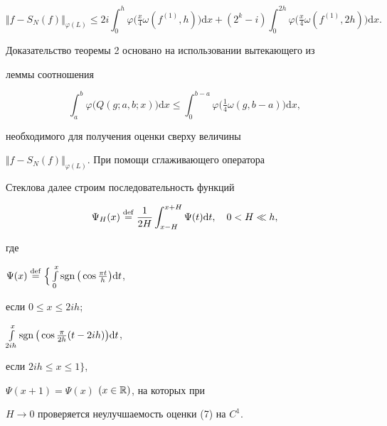 \begin{equation}


\Vert f-S_N(f)\Vert_{\varphi(L)} \leqslant 2i \int_0^h 


\varphi\big(\tfrac{x}{4} \omega(f^{(1)},h)\big)\mathrm{d} x +


(2^k -i) \int_0^{2h} \varphi\big(\tfrac{x}{4} \omega(f^{(1)},2h)\big)


\mathrm{d}x.


\end{equation}


\medskip





Доказательство теоремы 2 основано на использовании вытекающего из


леммы соотношения


$$


\int_a^b \varphi\big(Q(g;a,b;x)\big)\mathrm{d} x \leqslant \int_0^{b-a}


\varphi\big( \tfrac14 \omega(g,b-a)\big)\mathrm{d} x,


$$


необходимого для получения оценки сверху величины 


$\Vert f-S_N(f)\Vert_{\varphi(L)}$. При помощи сглаживающего оператора


Стеклова далее строим последовательность функций


$$


\Psi_H(x)\df \frac{1}{2H} \int_{x-H}^{x+H} \Psi(t)


\mathrm{d} t,\quad 0<H\ll h,


$$


где


$\Psi(x)\df\Big\{


\int\limits_0^x \sgn\big( \cos\frac{\pi t}{h}\big)\mathrm{d} t$,


если $0 \leqslant x \leqslant 2ih$;


$\int\limits_{2ih}^x\operatorname{sgn}\big(\cos\frac{\pi}{2h}(t-2ih)\big)\mathrm{d} t$,


если $2ih \leqslant x \leqslant 1\Big\}$,


$\Psi(x+1)=\Psi(x)$ $(x\in \Bbb{R})$, на которых при


$H\rightarrow 0$ проверяется неулучшаемость оценки (7) на $C^1$.





